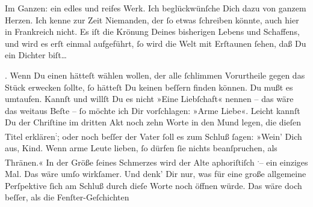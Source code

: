 \pstart
           Im Ganzen: ein edles und reifes Werk. Ich beglückwünſche Dich dazu von ganzem Herzen. Ich kenne zur Zeit
               Niemanden, der ſo etwas ſchreiben könnte, auch hier in Frankreich nicht. Es iſt die Krönung Deines bisherigen Lebens und Schaffens,
                  {\pb}und wird es erſt einmal aufgeführt, ſo wird die
               Welt mit Erſtaunen ſehen, daß Du ein Dichter biſt{\dots}\pend
           
\pstart
           \label{K_L02726-5v}\label{K_L02726-5}. Wenn Du
               einen hätteſt wählen wollen, der alle ſchlimmen Vorurtheile gegen das Stück erwecken ſollte, ſo hätteſt Du keinen
               beſſern finden können. Du mußt es umtaufen. Kannſt und willſt Du es nicht »Eine Liebſchaft« nennen – das
               wäre das weitaus Beſte – ſo {\pb}möchte ich Dir
               vorſchlagen: »Arme Liebe«.
               Leicht  kannſt Du der Chriſtine im dritten Akt noch zehn Worte in den Mund legen, die
               dieſen Titel erklären\substVorne{}\textsuperscript{:}\substDazwischen{};\substHinten{} oder noch beſſer der Vater ſoll es zum Schluß ſagen: »Wein’ Dich aus,  Kind. Wenn arme Leute lieben, ſo dürfen ſie nichts beanſpruchen, als
               Thränen.«  In der Größe ſeines Schmerzes wird der
               Alte aphoriſtiſch \substVorne{}\textsuperscript{.}\substDazwischen{}–\substHinten{} ein einziges Mal. Das wäre umſo wirkſamer. Und denk’ Dir nur, was  für eine {\pb}große
               allgemeine Perſpektive ſich am Schluß durch dieſe Worte noch öffnen würde. Das wäre doch beſſer, als die
                  Fenſter-Geſchichten {\dotsfive}\pend
           
